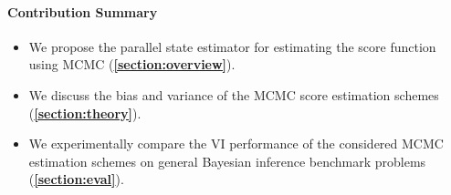 

\paragraph{Contribution Summary}
\vspace{-0.1in}
\begin{itemize}
\item[\ding{228}] We propose the parallel state estimator for estimating the score function using MCMC (\textbf{\cref{section:overview}}).
\vspace{-0.1in}
\item[\ding{228}] We discuss the bias and variance of the MCMC score estimation schemes (\textbf{\cref{section:theory}}).
\vspace{-0.1in}
\item[\ding{228}] We experimentally compare the VI performance of the considered MCMC estimation schemes on general Bayesian inference benchmark problems (\textbf{\cref{section:eval}}).
\end{itemize}

